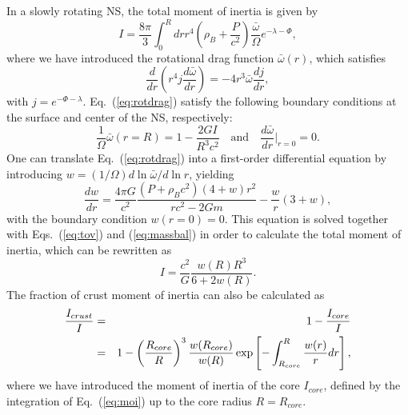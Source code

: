 In a slowly rotating NS, the total moment of inertia is given
by~\cite{Hartle1967}
%
\begin{equation}
  I = \frac{8\pi}{3}\int_0^R dr r^4\left(\rho_B +
  \frac{P}{c^2}\right)
  \frac{\bar{\omega}}{\Omega}e^{-\lambda-\Phi}\label{eq:moi},
\end{equation}
%
where we have introduced the rotational drag function $\bar{\omega}(r)$, which
satisfies
%
\begin{equation}
  \frac{d}{dr}\left(r^4j\frac{d\bar{\omega}}{dr}\right) =
  -4r^3\bar{\omega}\frac{dj}{dr},\label{eq:rotdrag}
\end{equation}
%
with $j=e^{-\Phi-\lambda}$. Eq.~(\ref{eq:rotdrag}) satisfy the following
boundary conditions at the surface and center of the NS, respectively:
%
\begin{equation}
  \frac{1}{\Omega}\bar{\omega}(r=R) = 1 - \frac{2GI}{R^3c^2} \quad \text{and} 
  \quad \frac{d\bar{\omega}}{dr}\bigg|_{r=0} = 0.
\end{equation}
%
One can translate Eq.~(\ref{eq:rotdrag}) into a first-order differential
equation by introducing $w = (1/\Omega)d\ln\bar{\omega}/d\ln r$, yielding
%
\begin{equation}
  \frac{dw}{dr} = \frac{4\pi G}{c^2}\frac{(P+\rho_Bc^2)(4+w)r^2}{rc^2-2Gm} -
  \frac{w}{r}(3+w)\label{eq:rotdrag2},
\end{equation}
%
with the boundary condition $w(r=0) = 0$. This equation is solved together with 
Eqs.~(\ref{eq:tov}) and (\ref{eq:massbal}) in order to calculate the total 
moment of inertia, which can be rewritten as
%
\begin{equation}
  I = \frac{c^2}{G}\frac{w(R)R^3}{6 + 2w(R)}.
\end{equation}
%
The fraction of crust moment of inertia can also be calculated 
as~\cite{Lim2019}
%
\begin{eqnarray}
  \frac{I_{crust}}{I} &=& 1 - \frac{I_{core}}{I}\notag\\
                      &=& 1 - \left(\frac{R_{core}}{R}\right)^3
                      \frac{w(R_{core})}{w(R)}
                      \exp\left[-\int_{R_{core}}^{R}\frac{w(r)}{r}dr\right],
                      \label{eq:crustmoi}
\end{eqnarray}
%
where we have introduced the moment of inertia of the core $I_{core}$, defined
by the integration of Eq.~(\ref{eq:moi}) up to the core radius $R=R_{core}$.

